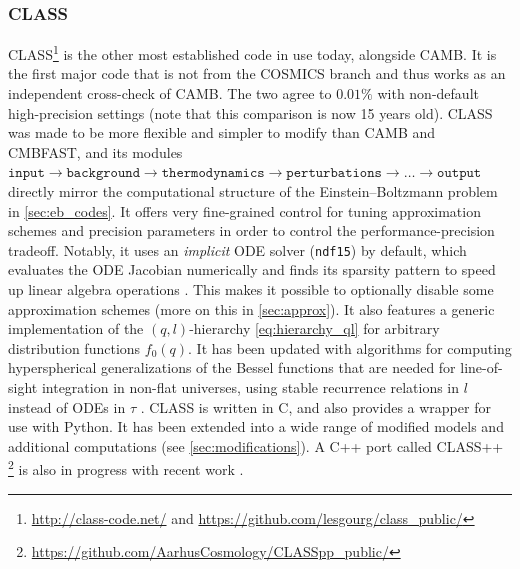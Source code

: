 \documentclass[USenglish, thumbmarks]{uiophdthesis} %
\newcommand\EB{Einstein--Boltzmann}
\begin{document}
\subsubsection{CLASS}
CLASS\footnote{\url{http://class-code.net/} and \url{https://github.com/lesgourg/class_public/}} \cite{lesgourguesCosmicLinearAnisotropy2011d,blasCosmicLinearAnisotropy2011c,lesgourguesCosmicLinearAnisotropy2011e,lesgourguesCosmicLinearAnisotropy2011f}
is the other most established code in use today, alongside CAMB.
It is the first major code that is not from the COSMICS branch
and thus works as an independent cross-check of CAMB.
The two agree to $0.01\%$ with non-default high-precision settings \cite{lesgourguesCosmicLinearAnisotropy2011e} (note that this comparison is now 15 years old).
CLASS was made to be more flexible and simpler to modify than CAMB and CMBFAST,
and its modules $\texttt{input} \to \texttt{background} \to \texttt{thermodynamics} \to \texttt{perturbations} \to \ldots \to \texttt{output}$
directly mirror the computational structure of the \EB{} problem in \cref{sec:eb_codes}.
It offers very fine-grained control for tuning approximation schemes and precision parameters
in order to control the performance-precision tradeoff.
Notably, it uses an \emph{implicit} ODE solver (\texttt{ndf15}) by default,
which evaluates the ODE Jacobian numerically and finds its sparsity pattern to speed up linear algebra operations \cite[appendix A]{blasCosmicLinearAnisotropy2011c}.
This makes it possible to optionally disable some approximation schemes (more on this in \cref{sec:approx}).
It also features a generic implementation of the $(q,l)$-hierarchy \eqref{eq:hierarchy_ql}
for arbitrary distribution functions $f_0(q)$.
It has been updated with algorithms for computing hyperspherical generalizations of the Bessel functions
that are needed for line-of-sight integration in non-flat universes,
using stable recurrence relations in $l$ instead of ODEs in $\tau$
\cite{lesgourguesFastAccurateCMB2014,thomastramComputationHypersphericalBessel2017}.
CLASS is written in C, and also provides a wrapper for use with Python.
It has been extended into a wide range of modified models and additional computations (see \cref{sec:modifications}).
A C++ port called CLASS++%
\footnote{\url{https://github.com/AarhusCosmology/CLASSpp_public/}}
is also in progress with recent work
\cite{nygaardCONNECTNeuralNetwork2023,uggerhojSelfInteractingNeutrinosNEDE2026}.
\end{document}
